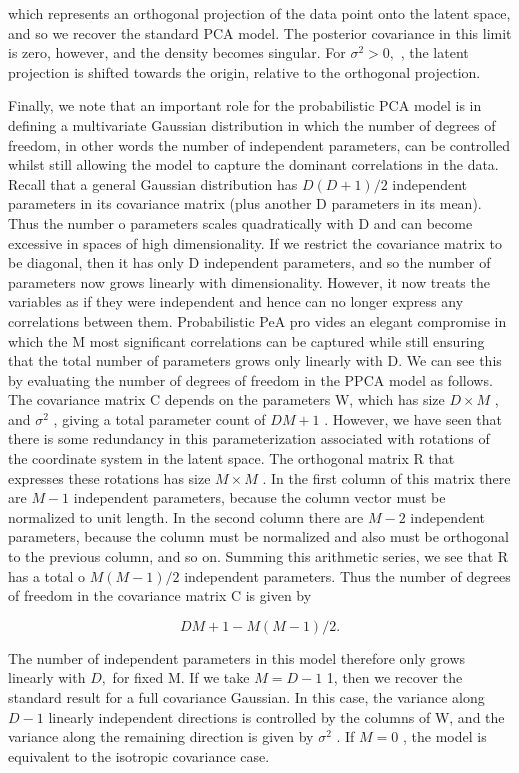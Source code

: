 \documentclass[
  10
]{article}
\begin{document}
which represents an orthogonal projection of the data point onto the
latent space, and so we recover the standard PCA model. The posterior
covariance in this limit is zero, however, and the density becomes
singular. For \(\sigma ^ { 2 } > 0 ,\) , the latent projection is
shifted towards the origin, relative to the orthogonal projection.

Finally, we note that an important role for the probabilistic PCA model
is in defining a multivariate Gaussian distribution in which the number
of degrees of freedom, in other words the number of independent
parameters, can be controlled whilst still allowing the model to capture
the dominant correlations in the data. Recall that a general Gaussian
distribution has \(D ( D + 1 ) / 2\) independent parameters in its
covariance matrix (plus another D parameters in its mean). Thus the
number o parameters scales quadratically with D and can become excessive
in spaces of high dimensionality. If we restrict the covariance matrix
to be diagonal, then it has only D independent parameters, and so the
number of parameters now grows linearly with dimensionality. However, it
now treats the variables as if they were independent and hence can no
longer express any correlations between them. Probabilistic PeA pro
vides an elegant compromise in which the M most significant correlations
can be captured while still ensuring that the total number of parameters
grows only linearly with D. We can see this by evaluating the number of
degrees of freedom in the PPCA model as follows. The covariance matrix C
depends on the parameters W, which has size \(D \times M\) , and
\(\sigma ^ { 2 }\) , giving a total parameter count of \(D M + 1\) .
However, we have seen that there is some redundancy in this
parameterization associated with rotations of the coordinate system in
the latent space. The orthogonal matrix R that expresses these rotations
has size \(M \times M\) . In the first column of this matrix there are
\(M - 1\) independent parameters, because the column vector must be
normalized to unit length. In the second column there are \(M - 2\)
independent parameters, because the column must be normalized and also
must be orthogonal to the previous column, and so on. Summing this
arithmetic series, we see that R has a total o \(M ( M - 1 ) / 2\)
independent parameters. Thus the number of degrees of freedom in the
covariance matrix C is given by

\[
D M + 1 - M (M - 1) / 2.\tag{12.51}
\]

The number of independent parameters in this model therefore only grows
linearly with \(D ,\) for fixed M. If we take \(M = D - 1\) 1, then we
recover the standard result for a full covariance Gaussian. In this
case, the variance along \(D - 1\) linearly independent directions is
controlled by the columns of W, and the variance along the remaining
direction is given by \(\sigma ^ { 2 }\) . If \(M = 0\) , the model is
equivalent to the isotropic covariance case.
\end{document}

